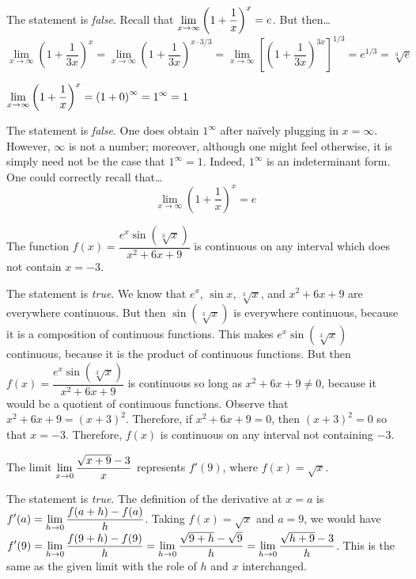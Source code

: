\documentclass[11pt,letterpaper]{article}
\begin{document}
\sol The statement is \textit{false}. Recall that $\displaystyle\lim_{x \to \infty} \left(1 + \dfrac{1}{x} \right)^x= e$. But then\dots
	\[
	\lim_{x \to \infty} \left(1 + \dfrac{1}{3x} \right)^x= \lim_{x \to \infty} \left(1 + \dfrac{1}{3x} \right)^{x \cdot 3/3}= \lim_{x \to \infty} \left[ \left(1 + \dfrac{1}{3x} \right)^{3x} \right]^{1/3}= e^{1/3}= \sqrt[3]{e}
	\] \pvspace{1.3cm}



 $\displaystyle\lim_{x \to \infty} \left(1 + \dfrac{1}{x} \right)^x= \left(1 + 0\right)^\infty= 1^\infty= 1$ \pspace

\sol The statement is \textit{false}. One does obtain $1^\infty$ after na\"ively plugging in $x= \infty$. However, $\infty$ is not a number; moreover, although one might feel otherwise, it is simply need not be the case that $1^\infty= 1$. Indeed, $1^\infty$ is an indeterminant form. One could correctly recall that\dots
	\[
	\lim_{x \to \infty} \left(1 + \dfrac{1}{x} \right)^x= e
	\] \pvspace{1.3cm}



 The function $f(x)= \dfrac{e^x \sin(\sqrt[3]{x})}{x^2 + 6x + 9}$ is continuous on any interval which does not contain $x= -3$. \pspace

\sol The statement is \textit{true}. We know that $e^x$, $\sin x$, $\sqrt[3]{x}$, and $x^2 + 6x + 9$ are everywhere continuous. But then $\sin(\sqrt[3]{x})$ is everywhere continuous, because it is a composition of continuous functions. This makes $e^x \sin(\sqrt[3]{x})$ continuous, because it is the product of continuous functions. But then $f(x)= \dfrac{e^x \sin(\sqrt[3]{x})}{x^2 + 6x + 9}$ is continuous so long as $x^2 + 6x + 9 \neq 0$, because it would be a quotient of continuous functions. Observe that $x^2 + 6x + 9= (x + 3)^2$. Therefore, if $x^2 + 6x + 9= 0$, then $(x + 3)^2= 0$ so that $x= -3$. Therefore, $f(x)$ is continuous on any interval not containing $-3$. \pvspace{1.3cm}



 The limit $\displaystyle\lim_{x \to 0} \dfrac{\sqrt{x + 9} - 3}{x}$ represents $f'(9)$, where $f(x)= \sqrt{x}$. 

\sol The statement is \textit{true}. The definition of the derivative at $x= a$ is $\displaystyle f'(a)= \lim_{h \to 0} \dfrac{f(a + h) - f(a)}{h}$. Taking $f(x)= \sqrt{x}$ and $a= 9$, we would have $\displaystyle f'(9)= \lim_{h \to 0} \dfrac{f(9 + h) - f(9)}{h}= \lim_{h \to 0} \dfrac{\sqrt{9 + h} - \sqrt{9}}{h}= \lim_{h \to 0} \dfrac{\sqrt{h + 9} - 3}{h}$. This is the same as the given limit with the role of $h$ and $x$ interchanged. \pvspace{1.3cm}
\end{document}
